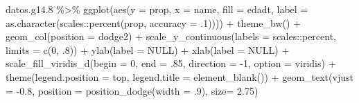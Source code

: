 \documentclass[
  12pt,
]{book}
\newenvironment{Shaded}{\begin{snugshade}}{\end{snugshade}}
\newcommand{\AttributeTok}[1]{\textcolor[rgb]{0.77,0.63,0.00}{#1}}
\newcommand{\ConstantTok}[1]{\textcolor[rgb]{0.00,0.00,0.00}{#1}}
\newcommand{\DecValTok}[1]{\textcolor[rgb]{0.00,0.00,0.81}{#1}}
\newcommand{\FloatTok}[1]{\textcolor[rgb]{0.00,0.00,0.81}{#1}}
\newcommand{\FunctionTok}[1]{\textcolor[rgb]{0.00,0.00,0.00}{#1}}
\newcommand{\NormalTok}[1]{#1}
\newcommand{\SpecialCharTok}[1]{\textcolor[rgb]{0.00,0.00,0.00}{#1}}
\newcommand{\StringTok}[1]{\textcolor[rgb]{0.31,0.60,0.02}{#1}}
\begin{document}
\begin{Shaded}
\begin{Highlighting}[]
\NormalTok{datos.g14}\FloatTok{.8} \SpecialCharTok{\%\textgreater{}\%} 
  \FunctionTok{ggplot}\NormalTok{(}\FunctionTok{aes}\NormalTok{(}\AttributeTok{y =}\NormalTok{ prop, }\AttributeTok{x =}\NormalTok{ name, }\AttributeTok{fill =}\NormalTok{ edadt, }
             \AttributeTok{label =} \FunctionTok{as.character}\NormalTok{(scales}\SpecialCharTok{::}\FunctionTok{percent}\NormalTok{(prop, }\AttributeTok{accuracy =}\NormalTok{ .}\DecValTok{1}\NormalTok{)))) }\SpecialCharTok{+} 
  \FunctionTok{theme\_bw}\NormalTok{() }\SpecialCharTok{+} 
  \FunctionTok{geom\_col}\NormalTok{(}\AttributeTok{position =} \StringTok{\textquotesingle{}dodge2\textquotesingle{}}\NormalTok{) }\SpecialCharTok{+}
  \FunctionTok{scale\_y\_continuous}\NormalTok{(}\AttributeTok{labels =}\NormalTok{ scales}\SpecialCharTok{::}\NormalTok{percent,}
                     \AttributeTok{limits =} \FunctionTok{c}\NormalTok{(}\DecValTok{0}\NormalTok{, .}\DecValTok{8}\NormalTok{)) }\SpecialCharTok{+}
  \FunctionTok{ylab}\NormalTok{(}\AttributeTok{label =} \ConstantTok{NULL}\NormalTok{) }\SpecialCharTok{+}
  \FunctionTok{xlab}\NormalTok{(}\AttributeTok{label =} \ConstantTok{NULL}\NormalTok{) }\SpecialCharTok{+}
  \FunctionTok{scale\_fill\_viridis\_d}\NormalTok{(}\AttributeTok{begin =} \DecValTok{0}\NormalTok{, }\AttributeTok{end =}\NormalTok{ .}\DecValTok{85}\NormalTok{, }\AttributeTok{direction =} \SpecialCharTok{{-}}\DecValTok{1}\NormalTok{, }\AttributeTok{option =} \StringTok{\textquotesingle{}viridis\textquotesingle{}}\NormalTok{) }\SpecialCharTok{+}
  \FunctionTok{theme}\NormalTok{(}\AttributeTok{legend.position =} \StringTok{\textquotesingle{}top\textquotesingle{}}\NormalTok{,}
        \AttributeTok{legend.title =} \FunctionTok{element\_blank}\NormalTok{()) }\SpecialCharTok{+}
  \FunctionTok{geom\_text}\NormalTok{(}\AttributeTok{vjust =} \SpecialCharTok{{-}}\FloatTok{0.8}\NormalTok{,}
            \AttributeTok{position =} \FunctionTok{position\_dodge}\NormalTok{(}\AttributeTok{width =}\NormalTok{ .}\DecValTok{9}\NormalTok{),}
            \AttributeTok{size=} \FloatTok{2.75}\NormalTok{)}
\end{Highlighting}
\end{Shaded}
\end{document}
